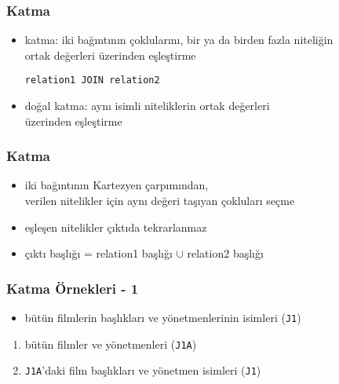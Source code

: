 \documentclass[dvipsnames]{beamer}
\theoremstyle{plain}
\begin{document}
\begin{frame}[fragile]
  \frametitle{Katma}

  \begin{itemize}
    \item \alert{katma}: iki bağıntının çoklularını, bir ya da birden fazla niteliğin\\
      ortak değerleri üzerinden eşleştirme
      \begin{lstlisting}
relation1 JOIN relation2
    \end{lstlisting}
    
    \pause
    \medskip
    \item \alert{doğal katma}: aynı isimli niteliklerin ortak değerleri\\
      üzerinden eşleştirme    
  \end{itemize}
\end{frame}

\begin{frame}[fragile]
  \frametitle{Katma}

  \begin{itemize}
    \item iki bağıntının Kartezyen çarpımından,\\
      verilen nitelikler için aynı değeri taşıyan çokluları seçme
    \item eşleşen nitelikler çıktıda tekrarlanmaz
    \medskip
    \item çıktı başlığı = relation1 başlığı $\cup$ relation2 başlığı
  \end{itemize}
\end{frame}

\begin{frame}
  \frametitle{Katma Örnekleri - 1}

    \begin{itemize}
      \item bütün filmlerin başlıkları ve yönetmenlerinin isimleri (\texttt{J1})
    \end{itemize}

    \pause
    \begin{enumerate}
      \item bütün filmler ve yönetmenleri (\texttt{J1A})

      \item \texttt{J1A}'daki film başlıkları ve yönetmen isimleri
         (\texttt{J1})
    \end{enumerate}
\end{frame}
\end{document}
